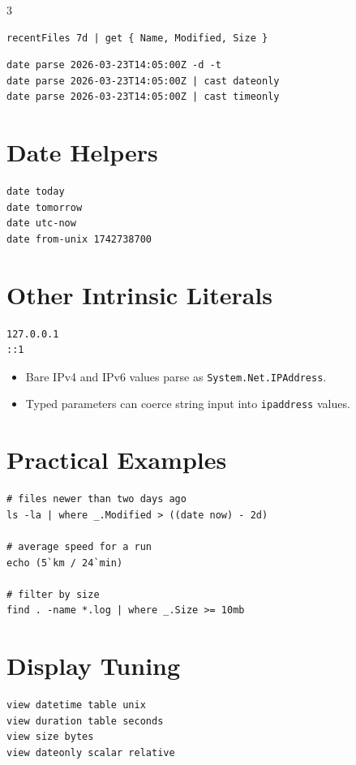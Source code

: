 \begin{multicols*}{3}
\begin{lstlisting}
recentFiles 7d | get { Name, Modified, Size }
\end{lstlisting}

\begin{lstlisting}
date parse 2026-03-23T14:05:00Z -d -t
date parse 2026-03-23T14:05:00Z | cast dateonly
date parse 2026-03-23T14:05:00Z | cast timeonly
\end{lstlisting}

\section{Date Helpers}
\begin{lstlisting}
date today
date tomorrow
date utc-now
date from-unix 1742738700
\end{lstlisting}

\section{Other Intrinsic Literals}
\begin{lstlisting}
127.0.0.1
::1
\end{lstlisting}

\begin{itemize}
\item Bare IPv4 and IPv6 values parse as \texttt{System.Net.IPAddress}.
\item Typed parameters can coerce string input into \texttt{ipaddress} values.
\end{itemize}

\section{Practical Examples}
\begin{lstlisting}
# files newer than two days ago
ls -la | where _.Modified > ((date now) - 2d)

# average speed for a run
echo (5`km / 24`min)

# filter by size
find . -name *.log | where _.Size >= 10mb
\end{lstlisting}

\section{Display Tuning}
\begin{lstlisting}
view datetime table unix
view duration table seconds
view size bytes
view dateonly scalar relative
\end{lstlisting}


\end{multicols*}
\newpage

